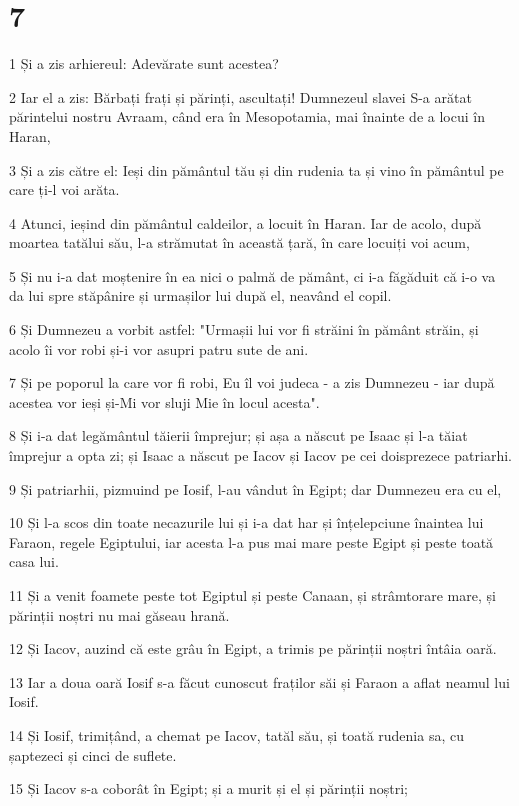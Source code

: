 \chapter{7}

\par 1 Și a zis arhiereul: Adevărate sunt acestea?
\par 2 Iar el a zis: Bărbați frați și părinți, ascultați! Dumnezeul slavei S-a arătat părintelui nostru Avraam, când era în Mesopotamia, mai înainte de a locui în Haran,
\par 3 Și a zis către el: Ieși din pământul tău și din rudenia ta și vino în pământul pe care ți-l voi arăta.
\par 4 Atunci, ieșind din pământul caldeilor, a locuit în Haran. Iar de acolo, după moartea tatălui său, l-a strămutat în această țară, în care locuiți voi acum,
\par 5 Și nu i-a dat moștenire în ea nici o palmă de pământ, ci i-a făgăduit că i-o va da lui spre stăpânire și urmașilor lui după el, neavând el copil.
\par 6 Și Dumnezeu a vorbit astfel: "Urmașii lui vor fi străini în pământ străin, și acolo îi vor robi și-i vor asupri patru sute de ani.
\par 7 Și pe poporul la care vor fi robi, Eu îl voi judeca - a zis Dumnezeu - iar după acestea vor ieși și-Mi vor sluji Mie în locul acesta".
\par 8 Și i-a dat legământul tăierii împrejur; și așa a născut pe Isaac și l-a tăiat împrejur a opta zi; și Isaac a născut pe Iacov și Iacov pe cei doisprezece patriarhi.
\par 9 Și patriarhii, pizmuind pe Iosif, l-au vândut în Egipt; dar Dumnezeu era cu el,
\par 10 Și l-a scos din toate necazurile lui și i-a dat har și înțelepciune înaintea lui Faraon, regele Egiptului, iar acesta l-a pus mai mare peste Egipt și peste toată casa lui.
\par 11 Și a venit foamete peste tot Egiptul și peste Canaan, și strâmtorare mare, și părinții noștri nu mai găseau hrană.
\par 12 Și Iacov, auzind că este grâu în Egipt, a trimis pe părinții noștri întâia oară.
\par 13 Iar a doua oară Iosif s-a făcut cunoscut fraților săi și Faraon a aflat neamul lui Iosif.
\par 14 Și Iosif, trimițând, a chemat pe Iacov, tatăl său, și toată rudenia sa, cu șaptezeci și cinci de suflete.
\par 15 Și Iacov s-a coborât în Egipt; și a murit și el și părinții noștri;
